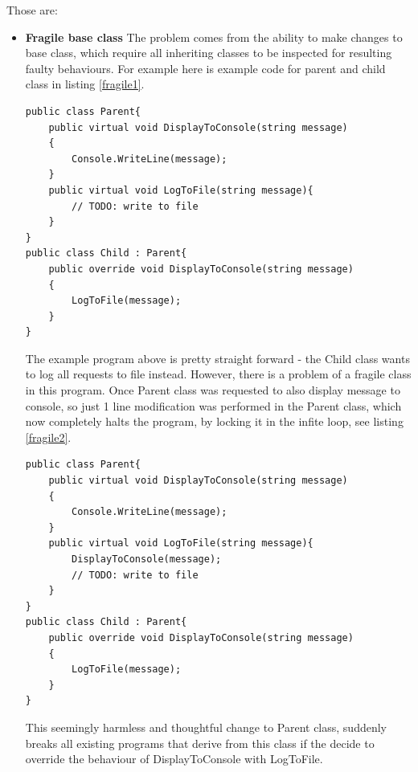 \documentclass{article}
\begin{document}
Those are:
\begin{itemize}
    \item \textbf{Fragile base class} \newline
          The problem comes from the ability to make changes to base class, which require all inheriting classes to be inspected for resulting faulty behaviours.
          For example here is example code for parent and child class in listing \ref*{fragile1}.
          \begin{lstlisting}[frame=single, label=fragile1, caption=Fragile Parent Class]
public class Parent{
    public virtual void DisplayToConsole(string message)
    {
        Console.WriteLine(message);
    }
    public virtual void LogToFile(string message){
        // TODO: write to file
    }
}
public class Child : Parent{
    public override void DisplayToConsole(string message)
    {
        LogToFile(message);
    }
}
    \end{lstlisting}
          The example program above is pretty straight forward - the Child class wants to log all requests to file instead. However, there is a problem of a fragile class in this program. Once Parent class was requested to also display message to console, so just 1 line modification was performed in the Parent class, which now completely halts the program, by locking it in the infite loop, see listing \ref*{fragile2}.
          \begin{lstlisting}[frame=single, label=fragile2, caption=Fragile Parent Class Backfired]
public class Parent{
    public virtual void DisplayToConsole(string message)
    {
        Console.WriteLine(message);
    }
    public virtual void LogToFile(string message){
        DisplayToConsole(message);
        // TODO: write to file
    }
}
public class Child : Parent{
    public override void DisplayToConsole(string message)
    {
        LogToFile(message);
    }
}
    \end{lstlisting}
          This seemingly harmless and thoughtful change to Parent class, suddenly breaks all existing programs that derive from this class if the decide to override the behaviour of DisplayToConsole with LogToFile.


\end{itemize}
\end{document}
